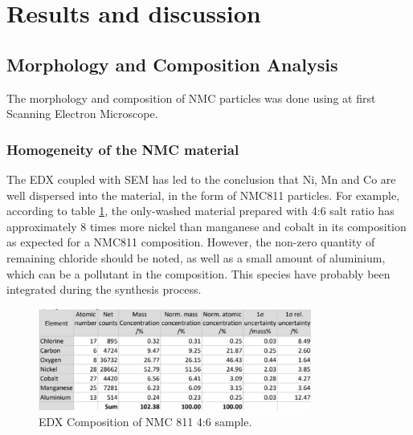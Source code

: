 \documentclass{article}
\begin{document}
\section{Results and discussion}
\subsection{Morphology and Composition Analysis}

The morphology and composition of NMC particles was done using at first Scanning Electron Microscope.

\subsubsection{Homogeneity of the NMC material}
The EDX coupled with SEM has led to the conclusion that Ni, Mn and Co are well dispersed into the material, in the form of NMC811 particles. 
For example, according to table \ref{tabl}, the only-washed material prepared with 4:6 salt ratio has approximately 8 times more nickel than manganese and cobalt in its composition as expected for a NMC811 composition. However, the non-zero quantity of remaining chloride should be noted, as well as a small amount of aluminium, which can be a pollutant in the composition. This species have probably been integrated during the synthesis process.\\
\begin{figure}[H]
  \centering
  \includegraphics[width=0.8\textwidth]{tabl.png}
  \caption{EDX Composition of NMC 811 4:6 sample.}
  \label{tabl}
\end{figure}
\end{document}
